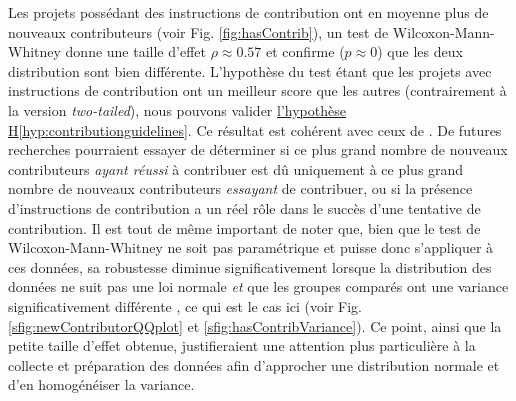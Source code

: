 \documentclass[dvipsnames,runningheads]{llncs}
\newcommand{\en}[1]{\foreignlanguage{english}{\emph{#1}}}
\begin{document}
    Les projets possédant des instructions de contribution ont en moyenne plus de nouveaux contributeurs (voir
    Fig. \ref{fig:hasContrib}), un test de Wilcoxon-Mann-Whitney donne une taille d'effet $\rho \approx 0.57$
    et confirme ($p \approx 0$) que les deux distribution sont bien différente. L'hypothèse du test étant que
    les projets avec instructions de contribution ont un meilleur score que les autres (contrairement à la
    version \en{two-tailed}), nous pouvons valider \hyperref[hyp:contributionguidelines]{l'hypothèse
    H\ref*{hyp:contributionguidelines}}. Ce résultat est cohérent avec ceux de \textcite[p.~11]{signals-2019}.
    De futures recherches pourraient essayer de déterminer si ce plus grand nombre de nouveaux contributeurs
    \emph{ayant réussi} à contribuer est dû uniquement à ce plus grand nombre de nouveaux contributeurs
    \emph{essayant} de contribuer, ou si la présence d'instructions de contribution a un réel rôle dans le
    succès d'une tentative de contribution. Il est tout de même important de noter que, bien que le test de
    Wilcoxon-Mann-Whitney ne soit pas paramétrique et puisse donc s'appliquer à ces données, sa robustesse
    diminue significativement lorsque la distribution des données ne suit pas une loi normale \emph{et} que
    les groupes comparés ont une variance significativement différente \parencite{WMW-robustness-1998}, ce qui
    est le cas ici (voir Fig. \ref{sfig:newContributorQQplot} et \ref{sfig:hasContribVariance}). Ce point,
    ainsi que la petite taille d'effet obtenue, justifieraient une attention plus particulière à la collecte
    et préparation des données afin d'approcher une distribution normale et d'en homogénéiser la variance.
\end{document}
